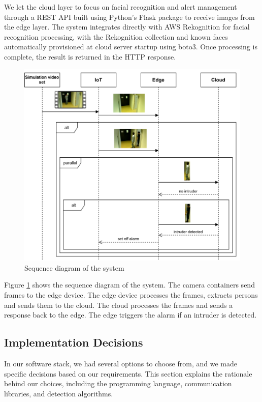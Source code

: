 \documentclass[conference]{IEEEtran}
\begin{document}
We let the cloud layer to focus on facial recognition and alert management through a REST API built using Python's Flask package to receive images from the edge layer. The system integrates directly with AWS Rekognition for facial recognition processing, with the Rekognition collection and known faces automatically provisioned at cloud server startup using boto3. Once processing is complete, the result is returned in the HTTP response.


\begin{figure}[!h]
    \includegraphics[width=1\linewidth]{./res/sequenz_diagram.png}
    \caption{Sequence diagram of the system}
    \label{fig:sequence_diagram}
\end{figure}

Figure \ref{fig:sequence_diagram} shows the sequence diagram of the system. The camera containers send frames to the edge device. The edge device processes the frames, extracts persons and sends them to the cloud. The cloud processes the frames and sends a response back to the edge. The edge triggers the alarm if an intruder is detected. 


\subsection{Implementation Decisions}
In our software stack, we had several options to choose from, and we made specific decisions based on our requirements. This section explains the rationale behind our choices, including the programming language, communication libraries, and detection algorithms.
\\
\end{document}
